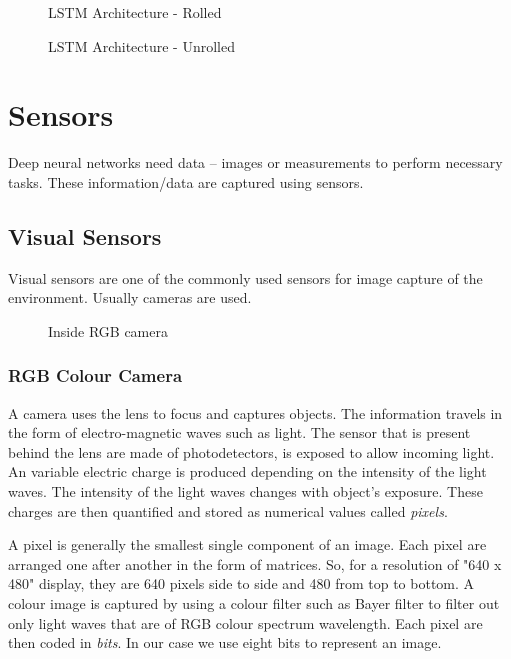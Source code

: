 \begin{figure}[h]
    \centering
	   \def\svgwidth{0.7\textwidth}
    \caption{LSTM Architecture - Rolled}
    \label{fig:lstm}
\end{figure}

\begin{figure}[h]
        \def\svgwidth{1.09\textwidth}
    \caption{LSTM Architecture - Unrolled}
    \label{fig:lstmunrolled}
\end{figure}
\hfill
\section{Sensors}
Deep neural networks need data -- images or measurements to perform necessary tasks. These
information/data are captured using sensors.
\subsection{Visual Sensors}
Visual sensors are one of the commonly used sensors for image capture of the environment.
Usually cameras are used.
\begin{figure}[h]
	\centering
    \def\svgwidth{0.6\textwidth}
    \caption{Inside RGB camera}
    \label{fig:rgbcamera}
\end{figure}

\subsubsection*{RGB Colour Camera}
A camera uses the lens to focus and captures objects. The information travels in the form of electro-magnetic waves such as light. The sensor
that is present behind the lens are made of photodetectors, is exposed to allow incoming
light. An variable electric charge is produced depending on the intensity of the light
waves. The intensity of the light waves changes with object's exposure. These charges are then quantified and stored as numerical values called
\textit{pixels}.

A pixel is generally the smallest single component of an image. Each pixel are arranged
one after another in the form of matrices. So, for a resolution of "640 x 480" display,
they are 640 pixels side to side and 480 from top to bottom.
A colour image is captured by using a colour filter such as Bayer filter to filter out
only light waves that are of RGB colour spectrum wavelength. Each pixel are then coded
in \textit{bits}. In our case we use eight bits to represent an image.


